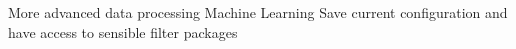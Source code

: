 More advanced data processing
Machine Learning
Save current configuration and have access to sensible filter packages
